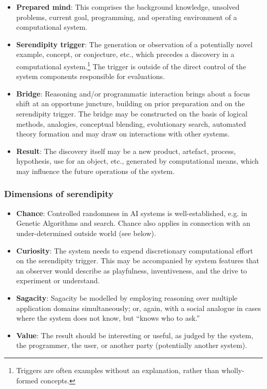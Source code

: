 \begin{itemize}
\item \textbf{Prepared mind}: This comprises the background knowledge,
  unsolved problems, current goal, programming, and operating
  environment of a computational system.
\item \textbf{Serendipity trigger}: The generation or observation of a
  potentially novel example, concept, or conjecture, etc., which
  precedes a discovery in a computational system.\footnote{Triggers
    are often examples without an explanation, rather than
    wholly-formed concepts.}  The trigger is outside of the direct
  control of the system components responsible for evaluations.
\item \textbf{Bridge}: Reasoning and/or programmatic interaction
  brings about a focus shift at an opportune juncture, building on
  prior preparation and on the serendipity trigger.  The bridge may be
  constructed on the basis of logical methods, analogies, conceptual
  blending, evolutionary search, automated theory formation and may
  draw on interactions with other systems.
\item \textbf{Result}: The discovery itself may be a new product,
  artefact, process, hypothesis, use for an object, etc., generated by
  computational means, which may influence the future operations of
  the system.
\end{itemize}

\subsubsection*{Dimensions of serendipity}

\begin{itemize}
\item \textbf{Chance}: Controlled randomness in AI systems is
  well-established, e.g. in Genetic Algorithms and search.  Chance
  also applies in connection with an under-determined outside world
  (see below).
\item \textbf{Curiosity}: The system needs to expend discretionary
  computational effort on the serendipity trigger.  This may be
  accompanied by system features that an observer would describe as
  playfulness, inventiveness, and the drive to experiment or
  understand.
\item \textbf{Sagacity}: Sagacity be modelled by employing reasoning
  over multiple application domains simultaneously; or, again, with a
  social analogue in cases where the system does not know, but ``knows
  who to ask.''
\item \textbf{Value}: The result should be interesting or useful, as
  judged by the system, the programmer, the user, or another party
  (potentially another system).
\end{itemize}


